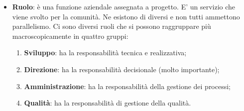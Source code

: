 \begin{itemize}
	\item \textbf{Ruolo}: è una funzione aziendale assegnata a progetto. E' un servizio che viene svolto per la comunità. Ne esistono di diversi e non tutti ammettono parallelismo. \newline
	Ci sono diversi ruoli che si possono raggruppare più macroscopicamente in quattro gruppi:
	\begin{enumerate}
		\item \textbf{Sviluppo}: ha la responsabilità tecnica e realizzativa;
		\item \textbf{Direzione}: ha la responsabilità decisionale (molto importante);
		\item \textbf{Amministrazione}: ha la responsabilità della gestione dei processi;
		\item \textbf{Qualità}: ha la responsabilità di gestione della qualità.
	\end{enumerate}

\end{itemize}
